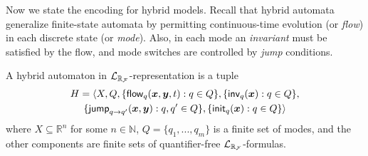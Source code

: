 Now we state the encoding for hybrid models. Recall that hybrid automata generalize finite-state
automata by permitting continuous-time evolution (or {\em flow}) in each discrete state (or {\em mode}). 
Also, in each mode an {\em invariant} must be satisfied by the flow, and mode switches are controlled
by {\em jump} conditions.

\begin{definition}\label{lrf-definition}
A hybrid automaton in $\mathcal{L}_{\mathbb{R}_{\mathcal{F}}}$-representation is a tuple
\begin{multline*}
H = \langle X, Q, \{{\flow}_q(\vec x, \vec y, t): q\in Q\},\{\inv_q(\vec x): q\in Q\},\\
\{\jump_{q\rightarrow q'}(\vec x, \vec y): q,q'\in Q\},\{\init_q(\vec x): q\in Q\}\rangle
\end{multline*}
where $X\subseteq \mathbb{R}^n$ for some $n\in \mathbb{N}$, $Q=\{q_1,...,q_m\}$ is a finite set of modes, and the other components are finite sets of quantifier-free $\mathcal{L}_{\mathbb{R}_{\mathcal{F}}}$-formulas.
\end{definition}
